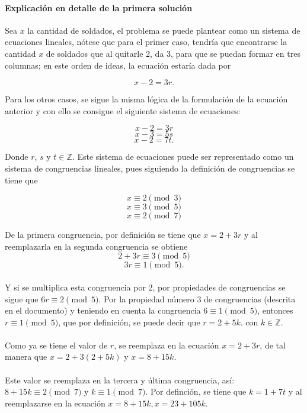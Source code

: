 \documentclass{article}
\begin{document}
	\paragraph{Explicación en detalle de la primera solución} Sea $x$ la cantidad de soldados, el problema se puede plantear como un sistema de ecuaciones lineales, nótese que para el primer caso, tendría que encontrarse la cantidad $x$ de soldados que al quitarle 2, da 3, para que se puedan formar en tres columnas; en este orden de ideas, la ecuación estaría dada por
	
	$$x-2=3r.$$
	
	Para los otros casos, se sigue la misma lógica de la formulación de la ecuación anterior y con ello se consigue el siguiente sistema de ecuaciones:
	
	$$x-2=3r$$
	$$x-3=5s$$
	$$x-2=7t.$$
	
	Donde $r$, $s$ y $t \in \mathbb{Z}$. Este sistema de ecuaciones puede ser representado como un sistema de congruencias lineales, pues siguiendo la definición de congruencias se tiene que
	
	$$x\equiv2\pmod{3}$$
	$$x\equiv3\pmod{5}$$
	$$x\equiv2\pmod{7}$$
	
	De la primera congruencia, por definición se tiene que $x=2+3r$ y al reemplazarla en la segunda congruencia se obtiene
	$$2+3r\equiv3\pmod{5}$$
	$$3r\equiv1\pmod{5}.$$
	
	\paragraph{} Y si se multiplica esta congruencia por 2, por propiedades de congruencias se sigue que $6r\equiv2\pmod{5}.$ Por la propiedad número 3 de congruencias (descrita en el documento) y teniendo en cuenta la congruencia $6 \equiv 1 \pmod{5}$, entonces $r\equiv 1\pmod{5}$, que por definición, se puede decir que $r=2+5k.$ con $k \in \mathbb{Z}$.
	
	\paragraph{}Como ya se tiene el valor de $r$, se reemplaza en la ecuación $x=2+3r$, de tal manera que $x = 2 + 3(2 + 5k) $ y $x = 8 +15k$.
	
	\paragraph{}Este valor se reemplaza en la tercera y última congruencia, así:
	$8 +15k\equiv2\pmod{7}$ y $k\equiv 1\pmod{7}$. Por definción, se tiene que $k=1+7t$ y al reemplazarse en la ecuación $x = 8 +15k, x = 23+105k$.
	
\end{document}
